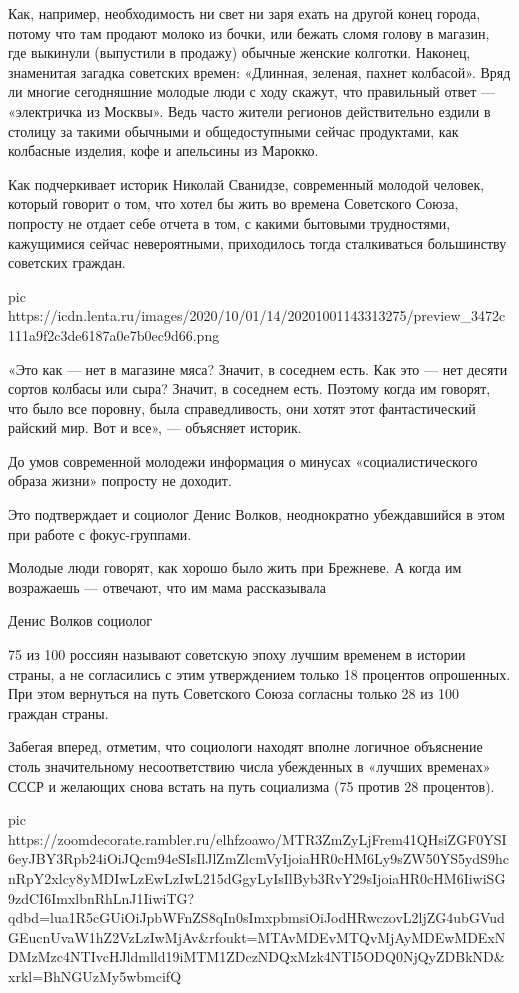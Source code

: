 Как, например, необходимость ни свет ни заря ехать на другой конец города,
потому что там продают молоко из бочки, или бежать сломя голову в магазин, где
выкинули (выпустили в продажу) обычные женские колготки. Наконец, знаменитая
загадка советских времен: «Длинная, зеленая, пахнет колбасой». Вряд ли многие
сегодняшние молодые люди с ходу скажут, что правильный ответ — «электричка из
Москвы». Ведь часто жители регионов действительно ездили в столицу за такими
обычными и общедоступными сейчас продуктами, как колбасные изделия, кофе и
апельсины из Марокко.

Как подчеркивает историк Николай Сванидзе, современный молодой человек, который
говорит о том, что хотел бы жить во времена Советского Союза, попросту не
отдает себе отчета в том, с какими бытовыми трудностями, кажущимися сейчас
невероятными, приходилось тогда сталкиваться большинству советских граждан.

\ifcmt
pic https://icdn.lenta.ru/images/2020/10/01/14/20201001143313275/preview_3472c111a9f2c3de6187a0e7b0ec9d66.png
\fi

«Это как — нет в магазине мяса? Значит, в соседнем есть. Как это — нет десяти
сортов колбасы или сыра? Значит, в соседнем есть. Поэтому когда им говорят, что
было все поровну, была справедливость, они хотят этот фантастический райский
мир. Вот и все», — объясняет историк.

До умов современной молодежи информация о минусах «социалистического образа
жизни» попросту не доходит.

Это подтверждает и социолог Денис Волков, неоднократно убеждавшийся в этом при
работе с фокус-группами.

Молодые люди говорят, как хорошо было жить при Брежневе. А когда им возражаешь
— отвечают, что им мама рассказывала

Денис Волков социолог

75 из 100 россиян называют советскую эпоху лучшим временем в истории страны, а
не согласились с этим утверждением только 18 процентов опрошенных. При этом
вернуться на путь Советского Союза согласны только 28 из 100 граждан страны.

Забегая вперед, отметим, что социологи находят вполне логичное объяснение столь
значительному несоответствию числа убежденных в «лучших временах» СССР и
желающих снова встать на путь социализма (75 против 28 процентов).

\ifcmt
pic https://zoomdecorate.rambler.ru/elhfzoawo/MTR3ZmZyLjFrem41QHsiZGF0YSI6eyJBY3Rpb24iOiJQcm94eSIsIlJlZmZlcmVyIjoiaHR0cHM6Ly9sZW50YS5ydS9hcnRpY2xlcy8yMDIwLzEwLzIwL215dGgyLyIsIlByb3RvY29sIjoiaHR0cHM6IiwiSG9zdCI6ImxlbnRhLnJ1IiwiTG?qdbd=lua1R5cGUiOiJpbWFnZS8qIn0sImxpbmsiOiJodHRwczovL2ljZG4ubGVudGEucnUvaW1hZ2VzLzIwMjAv&rfoukt=MTAvMDEvMTQvMjAyMDEwMDExNDMzMzc4NTIvcHJldmlld19iMTM1ZDczNDQxMzk4NTI5ODQ0NjQyZDBkND&xrkl=BhNGUzMy5wbmcifQ%
\fi
 
